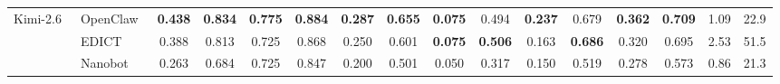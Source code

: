 \begin{table}[t]
{\begin{tabular}{ll cc cc cc cc cc cccc}
  \midrule

  \multirow{3}{*}{Kimi-2.6~\cite{kimi26}}
  & OpenClaw~\cite{openclaw} & \textbf{0.438} & \textbf{0.834} & \textbf{0.775} & \textbf{0.884} & \textbf{0.287} & \textbf{0.655} & \textbf{0.075} & 0.494 & \textbf{0.237} & 0.679 & \textbf{0.362} & \textbf{0.709} & 1.09 & 22.9 \\
  & EDICT~\cite{edict}    & 0.388 & 0.813 & 0.725 & 0.868 & 0.250 & 0.601 & \textbf{0.075} & \textbf{0.506} & 0.163 & \textbf{0.686} & 0.320 & 0.695 & 2.53 & 51.5 \\
  & Nanobot~\cite{nanobot}  & 0.263 & 0.684 & 0.725 & 0.847 & 0.200 & 0.501 & 0.050 & 0.317 & 0.150 & 0.519 & 0.278 & 0.573 & 0.86 & 21.3 \\

  \bottomrule
  \end{tabular} }
  \end{table}
\vspace{-8pt}

